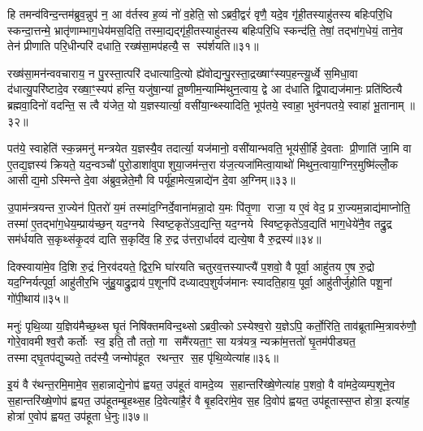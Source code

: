 हि तमन्व॑विन्द॒न्तम॑ब्रुव॒न्नुप॑ न॒ आ व॑र्तस्व ह॒व्यं नो॑ व॒हेति॒ सोऽब्रवी॒द्वरं॑ वृणै॒ यदे॒व गृ॑ही॒तस्याहु॑तस्य बहिःपरि॒धि स्कन्दा॒त्तन्मे॒ भ्रातृ॑णाम्भाग॒धेय॑मस॒दिति॒ तस्मा॒द्यद्गृ॑ही॒तस्याहु॑तस्य बहिःपरि॒धि स्कन्द॑ति॒ तेषां॒ तद्भा॑ग॒धेयं॒ ताने॒व तेन॑ प्रीणाति परि॒धीन्परि॑ दधाति॒ रख्ष॑सा॒मप॑हत्यै॒ स स्प॑र्शयति॥३१॥

रख्ष॑सा॒मन॑न्ववचाराय॒ न पु॒रस्ता॒त्परि॑ दधात्यादि॒त्यो ह्ये॑वोद्यन्पु॒रस्ता॒द्रख्षाꣳ॑स्यप॒हन्त्यू॒र्ध्वे स॒मिधा॒वा द॑धात्यु॒परि॑ष्टादे॒व रख्षा॒ꣳ॒स्यप॑ हन्ति॒ यजु॑षा॒न्यां तू॒ष्णीम॒न्याम्मि॑थुन॒त्वाय॒ द्वे आ द॑धाति द्वि॒पाद्यज॑मानः॒ प्रति॑ष्ठित्यै ब्रह्मवा॒दिनो॑ वदन्ति॒ स त्वै य॑जेत॒ यो य॒ज्ञस्यार्त्या॒ वसी॑या॒न्थ्स्यादिति॒ भूप॑तये॒ स्वाहा॒ भुव॑नपतये॒ स्वाहा॑ भू॒तानाम्॥३२॥

पत॑ये॒ स्वाहेति॑ स्क॒न्नमनु॑ मन्त्रयेत य॒ज्ञस्यै॒व तदार्त्या॒ यज॑मानो॒ वसी॑यान्भवति॒ भूय॑सी॒र्\mbox{}हि दे॒वताः प्री॒णाति॑ जा॒मि वा ए॒तद्य॒ज्ञस्य॑ क्रियते॒ यद॒न्वञ्चौ॑ पुरो॒डाशा॑वुपाशुया॒जम॑न्त॒रा य॑ज॒त्यजा॑मित्वा॒याथो॑ मिथुन॒त्वाया॒ग्निर॒मुष्मि॑ल्लोँ॒क आसीद्य॒मोऽस्मिन्ते दे॒वा अ॑ब्रुव॒न्नेते॒मौ वि पर्यू॑हा॒मेत्य॒न्नाद्ये॑न दे॒वा अ॒ग्निम्॥३३॥

उ॒पाम॑न्त्रयन्त रा॒ज्येन॑ पि॒तरो॑ य॒मं तस्मा॑द॒ग्निर्दे॒वाना॑मन्ना॒दो य॒मः पि॑तृ॒णा राजा॒ य ए॒वं वेद॒ प्र रा॒ज्यम॒न्नाद्य॑माप्नोति॒ तस्मा॑ ए॒तद्भा॑ग॒धेय॒म्प्राय॑च्छ॒न् यद॒ग्नये स्विष्ट॒कृते॑ऽव॒द्यन्ति॒ यद॒ग्नये स्विष्ट॒कृते॑ऽव॒द्यति॑ भाग॒धेये॑नै॒व तद्रु॒द्र सम॑र्धयति स॒कृथ्स॑कृ॒दव॑ द्यति स॒कृदि॑व॒ हि रु॒द्र उ॑त्तरा॒र्धादव॑ द्यत्ये॒षा वै रु॒द्रस्य॑॥३४॥

दिक्स्वाया॑मे॒व दि॒शि रु॒द्रं नि॒रव॑दयते॒ द्विर॒भि घा॑रयति चतुरव॒त्तस्याप्त्यै॑ प॒शवो॒ वै पूर्वा॒ आहु॑तय ए॒ष रु॒द्रो यद॒ग्निर्यत्पूर्वा॒ आहु॑तीर॒भि जु॑हु॒याद्रु॒द्राय॑ प॒शूनपि॑ दध्यादप॒शुर्यज॑मानः स्यादति॒हाय॒ पूर्वा॒ आहु॑तीर्जुहोति पशू॒नां गो॑पी॒थाय॑॥३५॥

{\anuvakamend[{श॒प्तस्स्प॑र्शयति भू॒ताना॑म॒ग्नि रु॒द्रस्य॑ स॒प्तत्रिꣳ॑शच्च॥६॥}]}

मनुः॑ पृथि॒व्या य॒ज्ञिय॑मैच्छ॒थ्स घृ॒तं निषि॑क्तमविन्द॒थ्सोऽब्रवी॒त्कोऽस्येश्व॒रो य॒ज्ञेऽपि॒ कर्तो॒रिति॒ ताव॑ब्रूताम्मि॒त्रावरु॑णौ॒ गोरे॒वावमीश्व॒रौ कर्तोः स्व॒ इति॒ तौ ततो॒ गा समै॑रयता॒ꣳ॒ सा यत्र॑यत्र॒ न्यक्रा॑म॒त्ततो॑ घृ॒तम॑पीड्यत॒ तस्माद्घृ॒तप॑द्युच्यते॒ तद॑स्यै॒ जन्मोप॑हूत रथन्त॒र स॒ह पृ॑थि॒व्येत्या॑ह॥३६॥

इ॒यं वै र॑थन्त॒रमि॒मामे॒व स॒हान्नाद्ये॒नोप॑ ह्वयत॒ उप॑हूतं वामदे॒व्य स॒हान्तरि॑ख्षे॒णेत्या॑ह प॒शवो॒ वै वा॑मदे॒व्यम्प॒शूने॒व स॒हान्तरि॑ख्षे॒णोप॑ ह्वयत॒ उप॑हूतम्बृ॒हथ्स॒ह दि॒वेत्या॑है॒रं वै बृ॒हदिरा॑मे॒व स॒ह दि॒वोप॑ ह्वयत॒ उप॑हूतास्स॒प्त होत्रा॒ इत्या॑ह॒ होत्रा॑ ए॒वोप॑ ह्वयत॒ उप॑हूता धे॒नुः॥३७॥

